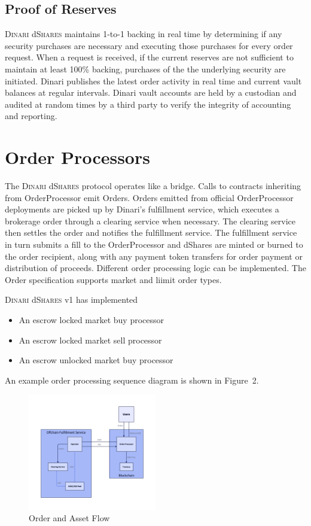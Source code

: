 \documentclass[sigconf,nonacm,prologue,table]{acmart}
\newcommand{\dshares}{\textsc{Dinari} d\textsc{Shares} }
\begin{document}
\subsection{Proof of Reserves}

\dshares maintains 1-to-1 backing in real time by determining if any security purchases are necessary and executing those purchases for every order request. When a request is received, if the current reserves are not sufficient to maintain at least 100\% backing, purchases of the the underlying security are initiated. Dinari publishes the latest order activity in real time and current vault balances at regular intervals. Dinari vault accounts are held by a custodian and audited at random times by a third party to verify the integrity of accounting and reporting. 

\section{Order Processors}
\label{sec:Processors}

The \dshares protocol operates like a bridge. Calls to contracts inheriting from OrderProcessor emit Orders. Orders emitted from official OrderProcessor deployments are picked up by Dinari's fulfillment service, which executes a brokerage order through a clearing service when necessary. The clearing service then settles the order and notifies the fulfillment service. The fulfillment service in turn submits a fill to the OrderProcessor and dShares are minted or burned to the order recipient, along with any payment token transfers for order payment or distribution of proceeds. Different order processing logic can be implemented. The Order specification supports market and liimit order types.

\dshares v1 has implemented
\begin{itemize}
    \item An escrow locked market buy processor
    \item An escrow locked market sell processor
    \item An escrow unlocked market buy processor
\end{itemize}

An example order processing sequence diagram is shown in Figure~2.

\begin{figure}
    \centering
    \includegraphics[width = 0.5\textwidth]{flow.d2}
    \caption{Order and Asset Flow}
    \label{fig:flow}
\end{figure}
\end{document}
